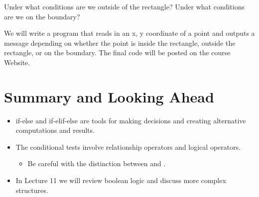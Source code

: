 \documentclass[letterpaper,10pt,english]{sphinxmanual}
\begin{document}
Under what conditions are we outside of the rectangle? Under what
conditions are we on the boundary?

We will write a program that reads in an x, y coordinate of a point
and outputs a message depending on whether the point is inside the
rectangle, outside the rectangle, or on the boundary.  The final code
will be posted on the course Website.


\section{Summary and Looking Ahead}
\label{\detokenize{lecture_notes/lec06_conditionals1:summary-and-looking-ahead}}\begin{itemize}
\item {} 
if-else and if-elif-else are tools for making decisions and creating
alternative computations and results.

\item {} 
The conditional tests involve relationship operators and logical
operators.
\begin{itemize}
\item {} 
Be careful with the distinction between \sphinxcode{\sphinxupquote{=}} and \sphinxcode{\sphinxupquote{==}}.

\end{itemize}

\item {} 
In Lecture 11 we will review boolean logic and discuss more complex 
structures.

\end{itemize}
\end{document}

